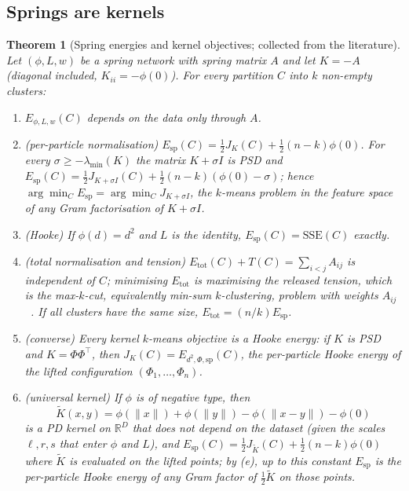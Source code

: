 \documentclass[11pt,a4paper]{article}
\theoremstyle{plain}
\newtheorem{theorem}{Theorem}[section]
\theoremstyle{definition}
\theoremstyle{remark}
\newcommand{\R}{\mathbb{R}}
\newcommand{\SSE}{\mathrm{SSE}}
\newcommand{\spec}{\mathrm{sp}}
\newcommand{\tot}{\mathrm{tot}}
\begin{document}
\subsection{Springs are kernels}

\begin{theorem}[Spring energies and kernel objectives; collected from the literature]\label{thm:main}
Let $(\phi,L,w)$ be a spring network with spring matrix $A$ and let $K=-A$ (diagonal included, $K_{ii}=-\phi(0)$). For every partition $C$ into $k$ non-empty clusters:
\begin{enumerate}[label=(\alph*),leftmargin=2em]
\item $E_{\phi,L,w}(C)$ depends on the data only through $A$.
\item (per-particle normalisation) $E_\spec(C)=\tfrac12 J_K(C)+\tfrac12(n-k)\phi(0)$. For every $\sigma\ge-\lambda_{\min}(K)$ the matrix $K+\sigma I$ is PSD and $E_\spec(C)=\tfrac12J_{K+\sigma I}(C)+\tfrac12(n-k)(\phi(0)-\sigma)$; hence $\arg\min_C E_\spec=\arg\min_C J_{K+\sigma I}$, the $k$-means problem in the feature space of any Gram factorisation of $K+\sigma I$.
\item (Hooke) If $\phi(d)=d^2$ and $L$ is the identity, $E_\spec(C)=\SSE(C)$ exactly.
\item (total normalisation and tension) $E_\tot(C)+T(C)=\sum_{i<j}A_{ij}$ is independent of $C$; minimising $E_\tot$ is maximising the released tension, which is the max-$k$-cut, equivalently min-sum $k$-clustering, problem with weights $A_{ij}$~\citep{sahni1976}. If all clusters have the same size, $E_\tot=(n/k)E_\spec$.
\item (converse) Every kernel $k$-means objective is a Hooke energy: if $K$ is PSD and $K=\Phi\Phi^{\!\top}$, then $J_K(C)=E_{d^2,\Phi,\spec}(C)$, the per-particle Hooke energy of the lifted configuration $(\Phi_1,\dots,\Phi_n)$.
\item (universal kernel) If $\phi$ is of negative type, then
\[
\widetilde K(x,y)=\phi(\lVert x\rVert)+\phi(\lVert y\rVert)-\phi(\lVert x-y\rVert)-\phi(0)
\]
is a PD kernel on $\R^D$ that does not depend on the dataset (given the scales $\ell,r,s$ that enter $\phi$ and $L$), and $E_\spec(C)=\tfrac12J_{\widetilde K}(C)+\tfrac12(n-k)\phi(0)$ where $\widetilde K$ is evaluated on the lifted points; by (e), up to this constant $E_\spec$ is the per-particle Hooke energy of any Gram factor of $\tfrac12\widetilde K$ on those points.
\end{enumerate}
\end{theorem}
\end{document}
